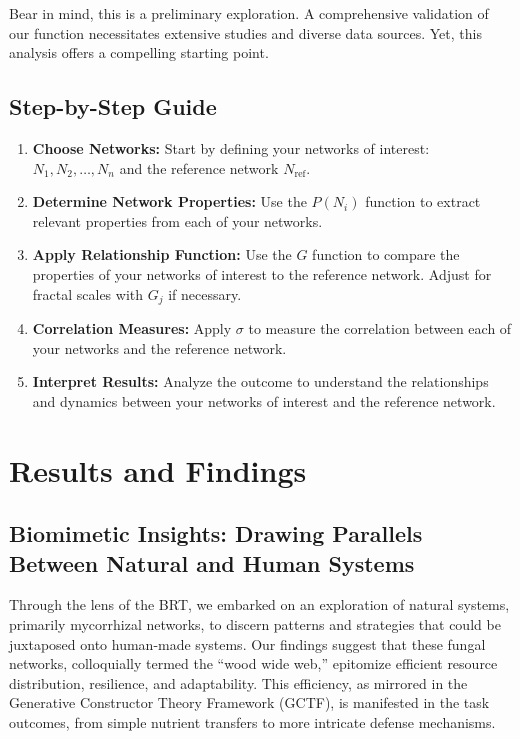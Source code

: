 \documentclass[sn-nature]{sn-jnl}%
\newcommand{\sbt}{\,\begin{picture}(-1,1)(-1,-3)\circle*{3}\end{picture}\ }
\theoremstyle{thmstyleone}%
\theoremstyle{thmstyletwo}%
\theoremstyle{thmstylethree}%
\begin{document}
Bear in mind, this is a preliminary exploration. A comprehensive validation of our function necessitates extensive studies and diverse data sources. Yet, this analysis offers a compelling starting point.

\subsection*{Step-by-Step Guide}
\begin{enumerate}
    \item[\sbt] \textbf{Choose Networks:} Start by defining your networks of interest: \(N_1, N_2, \dots, N_n\) and the reference network \(N_{\text{ref}}\).
    \item[\sbt] \textbf{Determine Network Properties:} Use the \(P(N_i)\) function to extract relevant properties from each of your networks.
    \item[\sbt] \textbf{Apply Relationship Function:} Use the \(G\) function to compare the properties of your networks of interest to the reference network. Adjust for fractal scales with \(G_j\) if necessary.
    \item[\sbt] \textbf{Correlation Measures:} Apply \(\sigma\) to measure the correlation between each of your networks and the reference network.
    \item[\sbt] \textbf{Interpret Results:} Analyze the outcome to understand the relationships and dynamics between your networks of interest and the reference network.
\end{enumerate}
\section{Results and Findings}\label{sec6}
\subsection{Biomimetic Insights: Drawing Parallels Between Natural and Human Systems}

Through the lens of the BRT, we embarked on an exploration of natural systems, primarily mycorrhizal networks, to discern patterns and strategies that could be juxtaposed onto human-made systems. Our findings suggest that these fungal networks, colloquially termed the \enquote{wood wide web,}\cite{wohlleben_hidden_2017} epitomize efficient resource distribution, resilience, and adaptability. This efficiency, as mirrored in the Generative Constructor Theory Framework (GCTF), is manifested in the task outcomes, from simple nutrient transfers to more intricate defense mechanisms.
\end{document}
